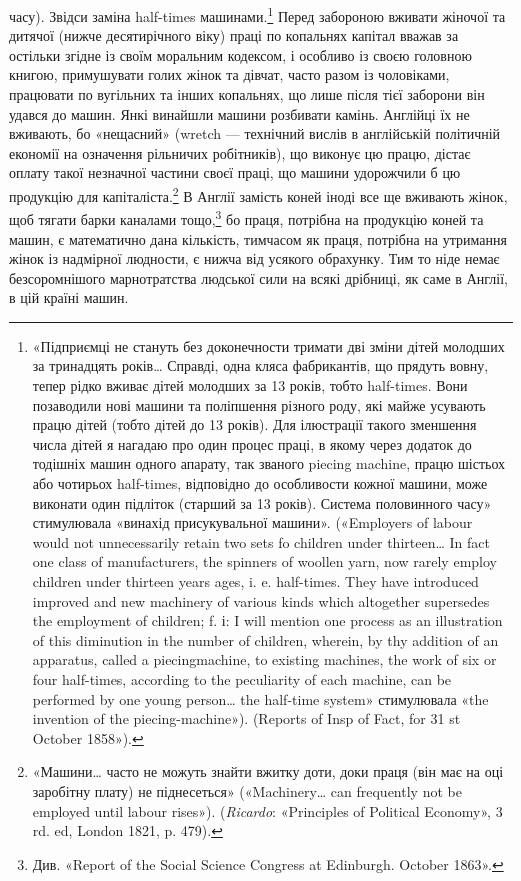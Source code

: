 часу). Звідси заміна half-times машинами.\footnote{
«Підприємці не стануть без доконечности тримати дві зміни дітей
молодших за тринадцять років\dots{} Справді, одна кляса фабрикантів, що
прядуть вовну, тепер рідко вживає дітей молодших за 13 років, тобто
half-times. Вони позаводили нові машини та поліпшення різного роду,
які майже усувають працю дітей (тобто дітей до 13 років). Для ілюстрації
такого зменшення числа дітей я нагадаю про один процес праці, в якому
через додаток до тодішніх машин одного апарату, так званого piecing
machine, працю шістьох або чотирьох half-times, відповідно до особливости
кожної машини, може виконати один підліток (старший за
13 років). Система половинного часу» стимулювала «винахід присукувальної
машини». («Employers of labour would not unnecessarily retain two sets
fo children under thirteen\dots{} In fact one class of manufacturers, the spinners
of woollen yarn, now rarely employ children under thirteen years ages, i. e.
half-times. They have introduced improved and new machinery of various
kinds which altogether supersedes the employment of children; f. і: I will
mention one process as an illustration of this diminution in the number
of children, wherein, by thy addition of an apparatus, called a piecingmachine,
to existing machines, the work of six or four half-times, according
to the peculiarity of each machine, can be performed by one young
person\dots{} the half-time system» стимулювала «the invention of the
piecing-machine»). (Reports of Insp of Fact, for 31 st October 1858»).
} Перед забороною
вживати жіночої та дитячої (нижче десятирічного віку) праці по
копальнях капітал вважав за остільки згідне із своїм моральним
кодексом, і особливо із своєю головною книгою, примушувати
голих жінок та дівчат, часто разом із чоловіками, працювати по
вугільних та інших копальнях, що лише після тієї заборони він
удався до машин. Янкі винайшли машини розбивати камінь.
Англійці їх не вживають, бо «нещасний» (wretch — технічний
вислів в англійській політичній економії на означення рільничих
робітників), що виконує цю працю, дістає оплату такої
незначної частини своєї праці, що машини удорожчили б цю
продукцію для капіталіста.\footnote{
«Машини\dots{} часто не можуть знайти вжитку доти, доки праця (він
має на оці заробітну плату) не піднесеться» («Machinery\dots{} can frequently
not be employed until labour rises»). (\emph{Ricardo}: «Principles of
Political Economy», 3 rd. ed, London 1821, p. 479).
} В Англії замість коней іноді все
ще вживають жінок, щоб тягати барки каналами тощо,\footnote{
Див. «Report of the Social Science Congress at Edinburgh. October
1863».
} бо
праця, потрібна на продукцію коней та машин, є математично
дана кількість, тимчасом як праця, потрібна на утримання жінок
із надмірної людности, є нижча від усякого обрахунку. Тим то
ніде немає безсоромнішого марнотратства людської сили на всякі
дрібниці, як саме в Англії, в цій країні машин.

